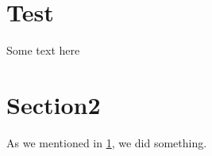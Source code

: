 \documentclass[12pt]{article}
\begin{document}
\section{Test}
\label{sec:section1}
Some text here

\section{Section2}
As we mentioned in \ref{sec:section1}, we did something.
\end{document}
